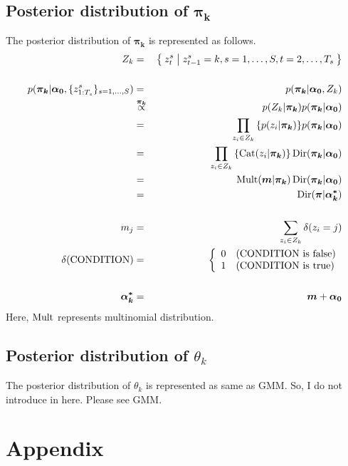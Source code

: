 \documentclass[a4paper]{article}
\DeclareMathOperator{\Cat}{\rm Cat}
\DeclareMathOperator{\Mult}{\rm Mult}
\DeclareMathOperator{\Dir}{\rm Dir}
\newcommand{\proptoas}[1]{\overset{#1}{\propto}}
\begin{document}
\subsection{Posterior distribution of $\boldsymbol{\pi_k}$}
The posterior distribution of $\boldsymbol{\pi_k}$ is represented as follows.
\begin{eqnarray}
	Z_{k} &=& \Set{z^{s}_{t} | z^{s}_{t-1} = k, s=1,\ldots,S, t=2,\ldots,T_s} \nonumber \\
	\\
	p(\boldsymbol{\pi_k} | \boldsymbol{\alpha_0}, \{z_{1:T_s}^{s}\}_{s=1,\ldots,S})
	&=&
	p(\boldsymbol{\pi_k} | \boldsymbol{\alpha_0}, Z_{k}) \\
	&\proptoas{\boldsymbol{\pi_k}}&
	p(Z_{k} | \boldsymbol{\pi_k}) p(\boldsymbol{\pi_k} | \boldsymbol{\alpha_0})\\
	&=&
	\prod_{z_i \in Z_k}{\left\{ p(z_i | \boldsymbol{\pi_k}) \right\} } p(\boldsymbol{\pi_k} | \boldsymbol{\alpha_0})\\
	&=&
	\prod_{z_i \in Z_k}{\left\{ \Cat(z_i | \boldsymbol{\pi_k}) \right\} } \Dir(\boldsymbol{\pi_k} | \boldsymbol{\alpha_0})\\
	&=&
	\Mult(\boldsymbol{m} | \boldsymbol{\pi_k}) \Dir(\boldsymbol{\pi_k} | \boldsymbol{\alpha_0})\\
	&=&
	\Dir(\boldsymbol{\pi} | \boldsymbol{\alpha^*_k})\\
	\nonumber \\
	m_j &=& \sum_{z_i \in Z_k}{\delta(z_i = j)}\\
	\delta(\text{CONDITION})
	&=&
	\left\{
	\begin{array}{ll}
		0 & (\text{CONDITION is false})\\
		1 & (\text{CONDITION is true})
	\end{array}
	\right.\\
	\nonumber\\
	\boldsymbol{\alpha^*_k} &=& \boldsymbol{m} + \boldsymbol{\alpha_0}
\end{eqnarray}
Here, $\Mult$ represents multinomial distribution.

\subsection{Posterior distribution of $\theta_k$}
The posterior distribution of $\theta_k$ is represented as same as GMM.
So, I do not introduce in here.
Please see GMM.

\newpage
\appendix
\section*{Appendix}
\end{document}
